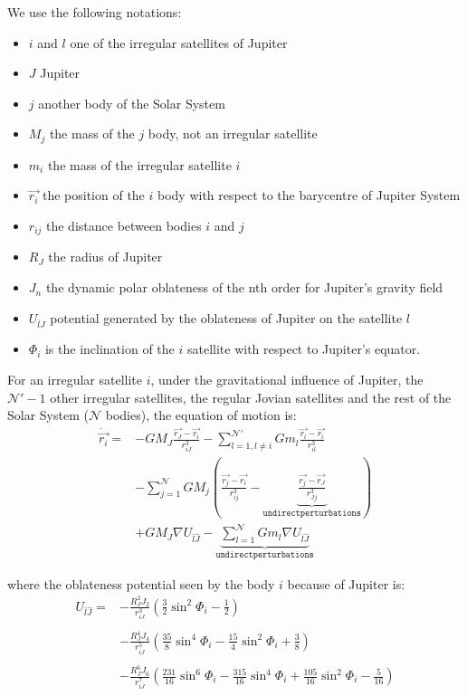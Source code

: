 \documentclass[traditabstract]{aa}
\begin{document}
We use the following notations: \begin{itemize}
\item $i$ and $l$ one of the irregular satellites of Jupiter
\item $J$ Jupiter 
\item $j$ another body of the Solar System
\item $M_j$ the mass of the $j$ body, not an irregular satellite
\item $m_i$ the mass of the irregular satellite $i$
\item $\vec{r_i}$ the position of the $i$ body with respect to the barycentre of Jupiter System
\item $r_{ij}$ the distance between bodies $i$ and $j$  
\item $R_J$ the radius of Jupiter
\item $J_n$ the dynamic polar oblateness of the nth order for Jupiter's gravity field
\item $U_{\bar{l}\hat{J}}$ potential generated by the oblateness of Jupiter on the satellite $l$
\item $\Phi_i$ is the inclination of the $i$ satellite with respect to Jupiter's equator.
\end{itemize}

For an irregular satellite $i$, under the gravitational influence of Jupiter, the $\mathcal{N'}-1$ other irregular satellites, the regular Jovian satellites and the rest of the Solar System ($\mathcal{N}$ bodies), the equation of motion is:
\begin{equation}\begin{array}{ll}

\ddot{\vec{r_i}}= & \displaystyle -GM_J\frac{\vec{r_J}-\vec{r_i}}{r_{iJ}^3}-\sum_{l=1,l\neq i}^\mathcal{N'}Gm_l\frac{\vec{r_l}-\vec{r_i}}{r_{il}^3}\\
&\displaystyle -\sum_{j=1}^\mathcal{N}GM_j \left(\frac{\vec{r_j}-\vec{r_i}}{r_{ij}^3} - \underbrace{\frac{\vec{r_j}-\vec{r_J}}{r_{Jj}^3}}_\mathtt{undirect perturbations} \right)\\
 & \displaystyle +GM_J \nabla U_{\bar{l}\hat{J}} -\underbrace{\sum_{l=1}^\mathcal{N} Gm_l\nabla U_{\bar{l}\hat{J}}}_\mathtt{undirect perturbations}
\end{array}
\end{equation}

where the oblateness potential seen by the body $i$ because of Jupiter is:
\begin{equation}\begin{array}{ll}

U_{\bar{l}\hat{J}}=&\displaystyle -\frac{R_J^2 J_2}{r_{iJ}^3}\left(\frac{3}{2}\sin^2 \Phi_i-\frac{1}{2}\right)\\ &\\ & 
\displaystyle-\frac{R_J^4 J_4}{r_{iJ}^5}\left(\frac{35}{8}\sin^4 \Phi_i-\frac{15}{4}\sin^2 \Phi_i+\frac{3}{8}\right)\\
& \\
&\displaystyle-\frac{R_J^6 J_6}{r_{iJ}^7}\left(\frac{231}{16}\sin^6 \Phi_i-\frac{315}{16}\sin^4 \Phi_i+\frac{105}{16}\sin^2 \Phi_i-\frac{5}{16}\right)

\end{array}
\end{equation}
\end{document}
